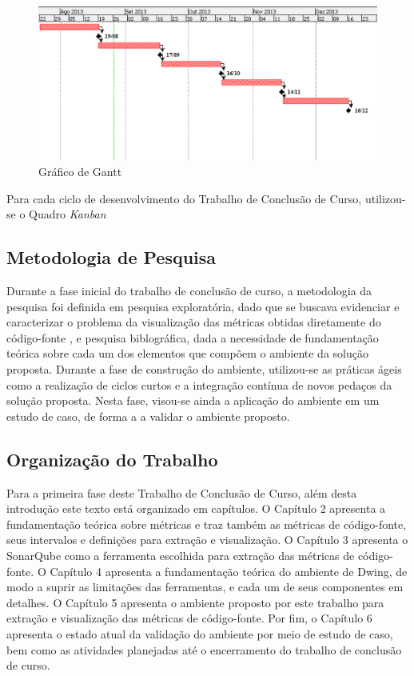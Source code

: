 	\begin{figure}[h]
		\centering
			\includegraphics[keepaspectratio=true,scale=0.7]{figuras/gantt_chart.eps}
		\caption{Gráfico de Gantt}
		\label{gantt}
	\end{figure}

Para cada ciclo de desenvolvimento do Trabalho de Conclusão de Curso,  utilizou-se o Quadro \textit{Kanban}  

\subsection {Metodologia de Pesquisa}
Durante a fase inicial do trabalho de conclusão de curso, a metodologia da pesquisa foi definida em pesquisa exploratória, dado que se buscava evidenciar e caracterizar o problema da visualização das métricas obtidas diretamente do código-fonte , 
e pesquisa biblográfica, dada a necessidade de fundamentação teórica sobre cada um dos elementos que compõem o ambiente da solução proposta. Durante a fase de construção do ambiente, utilizou-se
as práticas ágeis como a realização de ciclos curtos e a integração contínua de novos pedaços da solução proposta. Nesta fase, visou-se ainda a aplicação do ambiente em um estudo de caso, 
de forma a  a validar o ambiente proposto.  

\subsection{Organização do Trabalho}
Para a primeira fase deste Trabalho de Conclusão de Curso, além desta introdução
este texto está organizado em capítulos. O Capítulo 2 apresenta a fundamentação teórica
sobre métricas e traz também as métricas de código-fonte, seus intervalos e definições para extração e visualização. O Capítulo 3 apresenta o SonarQube como a ferramenta escolhida para extração das métricas de código-fonte.
O Capítulo 4 apresenta a fundamentação teórica do ambiente de Dwing, de modo a suprir as limitações das ferramentas, e cada um de seus componentes em detalhes. 
O Capítulo 5 apresenta o ambiente proposto por este trabalho para extração e visualização das métricas de código-fonte. Por fim, o Capítulo 6 apresenta o estado atual da validação 
do ambiente por meio de estudo de caso, bem como as atividades planejadas até o encerramento do trabalho de conclusão de curso.
%

